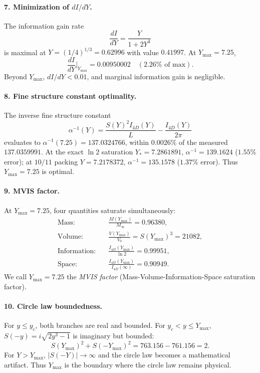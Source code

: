\documentclass[a4paper,1pt,oneside,openany]{book}
\begin{document}
\paragraph{7. Minimization of \(dI/dY\).} The information gain rate
\begin{equation}
\frac{dI}{dY} = \frac{Y}{1+2Y^3}
\end{equation}
is maximal at \(Y = (1/4)^{1/3} = 0.62996\) with value \(0.41997\). At \(Y_{\max} = 7.25\),
\begin{equation}
\frac{dI}{dY}\bigg|_{Y_{\max}} = 0.00950002 \quad (2.26\%\text{ of max}).
\end{equation}
Beyond \(Y_{\max}\), \(dI/dY < 0.01\), and marginal information gain is negligible.

\paragraph{8. Fine structure constant optimality.} The inverse fine structure constant
\begin{equation}
\alpha^{-1}(Y) = \frac{S(Y)^2 I_{4D}(Y)}{L} - \frac{I_{4D}(Y)}{2\pi}
\end{equation}
evaluates to \(\alpha^{-1}(7.25) = 137.0324766\), within \(0.0026\%\) of the measured \(137.0359991\). At the exact \(\ln 2\) saturation \(Y_* = 7.2861891\), \(\alpha^{-1} = 139.1624\) (\(1.55\%\) error); at \(10/11\) packing \(Y = 7.2178372\), \(\alpha^{-1} = 135.1578\) (\(1.37\%\) error). Thus \(Y_{\max} = 7.25\) is optimal.

\paragraph{9. MVIS factor.} At \(Y_{\max} = 7.25\), four quantities saturate simultaneously:
\begin{align}
\text{Mass:} \quad & \frac{M(Y_{\max})}{M_\infty} = 0.96380, \\
\text{Volume:} \quad & \frac{V(Y_{\max})}{V_0} = S(Y_{\max})^3 = 21082, \\
\text{Information:} \quad & \frac{I_{4D}(Y_{\max})}{\ln 2} = 0.99951, \\
\text{Space:} \quad & \frac{I_{4D}(Y_{\max})}{I_{4D}(\infty)} = 0.90949.
\end{align}
We call \(Y_{\max} = 7.25\) the \emph{MVIS factor} (Mass-Volume-Information-Space saturation factor).

\paragraph{10. Circle law boundedness.} For \(y \leq y_c\), both branches are real and bounded. For \(y_c < y \leq Y_{\max}\), \(S(-y) = i\sqrt{2y^3-1}\) is imaginary but bounded:
\begin{equation}
S(Y_{\max})^2 + S(-Y_{\max})^2 = 763.156 - 761.156 = 2.
\end{equation}
For \(Y > Y_{\max}\), \(|S(-Y)| \to \infty\) and the circle law becomes a mathematical artifact. Thus \(Y_{\max}\) is the boundary where the circle law remains physical.
\end{document}
